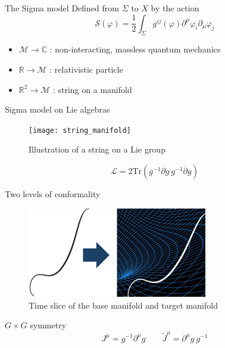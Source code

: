 \documentclass{beamer}
\begin{document}
\begin{frame}{The Sigma model}
    Defined from $\Sigma$ to $X$ by the action 
    \begin{equation}
        \mathcal{S}(\varphi) = \frac{1}{2}\int_{\Sigma} g^{ij}(\varphi) \partial^\mu \varphi_i \partial_\mu \varphi_j
    \end{equation}
    \begin{itemize}
        \item $\mathcal{M} \rightarrow \mathbb{C}$ : non-interacting, massless quantum mechanics
        \item $\mathbb{R} \rightarrow \mathcal{M}$ : relativistic particle
        \item $\mathbb{R}^2 \rightarrow \mathcal{M}$ : string on a manifold
    \end{itemize}
\end{frame}

\begin{frame}{Sigma model on Lie algebras}
    \begin{figure}
        \centering
        \texttt{[image: string\_manifold]}
        \caption{Illustration of a string on a Lie group}
    \end{figure}
    \begin{equation}
        \mathcal{L} = 2 \text{Tr}(g^{-1}\partial g ~ g^{-1}\overline{\partial} g)
    \end{equation}
\end{frame}

\begin{frame}{Two levels of conformality}
    \begin{figure}
        \centering
        \includegraphics[width=0.7\textwidth]{string_field}
        \caption{Time slice of the base manifold and target manifold}
    \end{figure}
    \begin{alertblock}{$G\times G$ symmetry}
        \begin{equation}
            J^\mu = g^{-1}\partial^\mu g \qquad \tilde{J}^\mu = \partial^\mu g~g^{-1}
        \end{equation}
    \end{alertblock}
\end{frame}
\end{document}
